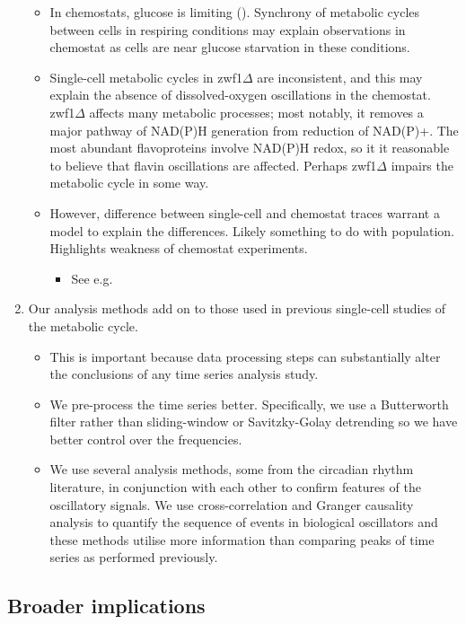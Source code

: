 \begin{enumerate}
\begin{itemize}
\item In chemostats, glucose is limiting (\cite{jonesCyberneticModelGrowth1999}).  Synchrony of metabolic cycles between cells in respiring conditions may explain observations in chemostat as cells are near glucose starvation in these conditions.
\item Single-cell metabolic cycles in zwf1\(\Delta\) are inconsistent, and this may explain the absence of dissolved-oxygen oscillations in the chemostat.  zwf1\(\Delta\) affects many metabolic processes; most notably, it removes a major pathway of NAD(P)H generation from reduction of NAD(P)+.  The most abundant flavoproteins involve NAD(P)H redox, so it it reasonable to believe that flavin oscillations are affected.  Perhaps zwf1\(\Delta\) impairs the metabolic cycle in some way.
\item However, difference between single-cell and chemostat traces warrant a model to explain the differences.  Likely something to do with population.  Highlights weakness of chemostat experiments.
\begin{itemize}
\item See e.g. \cite{burnettiCellCycleStart2016}
\end{itemize}
\end{itemize}
\item Our analysis methods add on to those used in previous single-cell studies of the metabolic cycle.
\begin{itemize}
\item This is important because data processing steps can substantially alter the conclusions of any time series analysis study.
\item We pre-process the time series better.  Specifically, we use a Butterworth filter rather than sliding-window or Savitzky-Golay detrending so we have better control over the frequencies.
\item We use several analysis methods, some from the circadian rhythm literature, in conjunction with each other to confirm features of the oscillatory signals.  We use cross-correlation and Granger causality analysis to quantify the sequence of events in biological oscillators and these methods utilise more information than comparing peaks of time series as performed previously.
\end{itemize}
\end{enumerate}

\subsection{Broader implications}
\label{sec:biology-discussion-implications}

